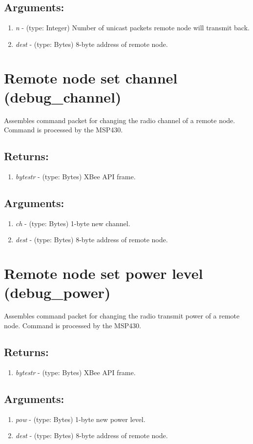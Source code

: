 \subsection{Arguments:}
\begin{enumerate}
\item \emph{n} - (type: Integer) Number of unicast packets remote node will transmit back.
\item \emph{dest} - (type: Bytes) 8-byte address of remote node.
\end{enumerate}

\section{Remote node set channel (debug\_channel)}
Assembles command packet for changing the radio channel of a remote node. Command is processed by the MSP430.
\subsection{Returns:}
\begin{enumerate}
\item \emph{bytestr} - (type: Bytes) XBee API frame.
\end{enumerate}
\subsection{Arguments:}
\begin{enumerate}
\item \emph{ch} - (type: Bytes) 1-byte new channel.
\item \emph{dest} - (type: Bytes) 8-byte address of remote node.
\end{enumerate}

\section{Remote node set power level (debug\_power)}
Assembles command packet for changing the radio transmit power of a remote node. Command is processed by the MSP430.
\subsection{Returns:}
\begin{enumerate}
\item \emph{bytestr} - (type: Bytes) XBee API frame.
\end{enumerate}
\subsection{Arguments:}
\begin{enumerate}
\item \emph{pow} - (type: Bytes) 1-byte new power level.
\item \emph{dest} - (type: Bytes) 8-byte address of remote node.
\end{enumerate}

